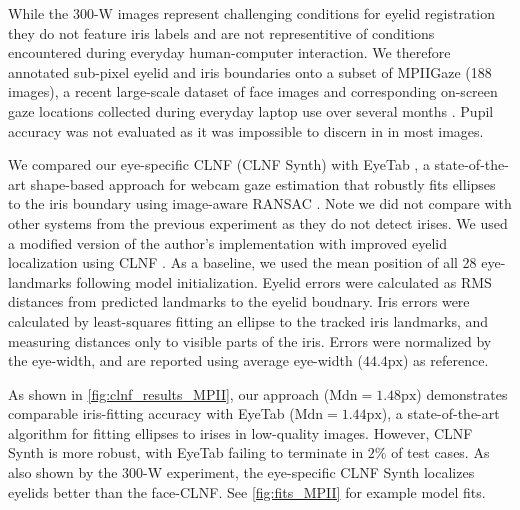 While the 300-W images represent challenging conditions for eyelid registration they do not feature iris labels and are not representitive of conditions encountered during everyday human-computer interaction.
We therefore annotated sub-pixel eyelid and iris boundaries onto a subset of MPIIGaze (188 images), a recent large-scale dataset of face images and corresponding on-screen gaze locations collected during everyday laptop use over several months \cite{zhang15_cvpr}.
Pupil accuracy was not evaluated as it was impossible to discern in in most images.

We compared our eye-specific CLNF (CLNF Synth) with EyeTab \cite{wood2014eyetab}, a state-of-the-art shape-based approach for webcam gaze estimation that robustly fits ellipses to the iris boundary using image-aware RANSAC \cite{swirski2012robust}. Note we did not compare with other systems from the previous experiment as they do not detect irises.
We used a modified version of the author's implementation with improved eyelid localization using CLNF \cite{baltrusaitis2013constrained}.
As a baseline, we used the mean position of all 28 eye-landmarks following model initialization.
Eyelid errors were calculated as RMS distances from predicted landmarks to the eyelid boudnary.
Iris errors were calculated by least-squares fitting an ellipse to the tracked iris landmarks, and measuring distances only to visible parts of the iris.
Errors were normalized by the eye-width, and are reported using average eye-width ($44.4\textrm{px}$) as reference.

As shown in \autoref{fig:clnf_results_MPII}, our approach ($\textrm{Mdn}\!=\!1.48\textrm{px}$) demonstrates comparable iris-fitting accuracy with EyeTab ($\textrm{Mdn}\!=\!1.44\textrm{px}$), a state-of-the-art algorithm for fitting ellipses to irises in low-quality images.
However, CLNF Synth is more robust, with EyeTab failing to terminate in $2\%$ of test cases.
As also shown by the 300-W experiment, the eye-specific CLNF Synth localizes eyelids better than the face-CLNF.
See \autoref{fig:fits_MPII} for example model fits.


